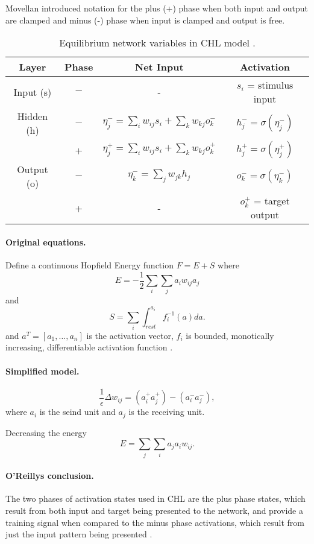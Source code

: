 Movellan introduced notation for the plus (+) phase when both input and output are clamped and minus (-) phase when input is clamped and output is free. 

\begin{table}
  \centering
  \caption{Equilibrium network variables in CHL model \citet{farkas2013bal}.}
  \label{tab:chl-states}
  \begin{tabular}{|cccc|}
    \hline
    Layer & Phase & Net Input & Activation\\
    \hline
    Input (s)    & $-$ & - & $s_i$ = stimulus input\\
    \hline
    Hidden (h)   & $-$ & \hspace{0.3cm}$\eta^{-}_j = \sum_i w_{ij}s_i + \sum_k w_{kj}o^{-}_k$\hspace{0.3cm} &
    $h^{-}_j = \sigma(\eta^{-}_j)$\hspace{0.3cm}\\
          &  +  & $\eta^{+}_j = \sum_{i}w_{ij}s_i + \sum_k w_{kj}o^{+}_k$ & $h^{+}_{j} = \sigma(\eta^{+}_j)$ \\
    \hline
    Output (o) & $-$ & $\eta^{-}_k = \sum_j w_{jk}h_j$ & $o^{-}_k = \sigma(\eta^{-}_k)$\\
           &  +  & - & $o^{+}_k$ = target output \\
    \hline
  \end{tabular}
\end{table}

\paragraph{Original equations.}
Define a continuous Hopfield Energy function $F = E + S$ where
$$ E = -\frac{1}{2}\sum_i\sum_ja_iw_{ij}a_j$$
and 
$$ S = \sum_i \int_{rest}^{a_i} f_i^{-1}(a)da.$$
and $a^T = [a_1,\ldots,a_n]$ is the activation vector, $f_i$ is bounded, monotically increasing, differentiable activation function \citet{movellan1990contrastive}.

\paragraph{Simplified model.}

$$\frac{1}{\epsilon}\Delta w_{ij} = (a_i^+a_j^+)-(a_i^-a_j^-),$$
where $a_i$ is the seind unit and $a_j$ is the receiving unit. 

Decreasing the energy
$$E = \sum_j\sum_i a_j a_i w_{ij}.$$

\paragraph{O'Reillys conclusion.}

The two phases of activation states used in CHL are the plus phase states, which result from both input
and target being presented to the network, and provide a training signal when compared to the minus phase
activations, which result from just the input pattern being presented \citet{o1996bio}. 

